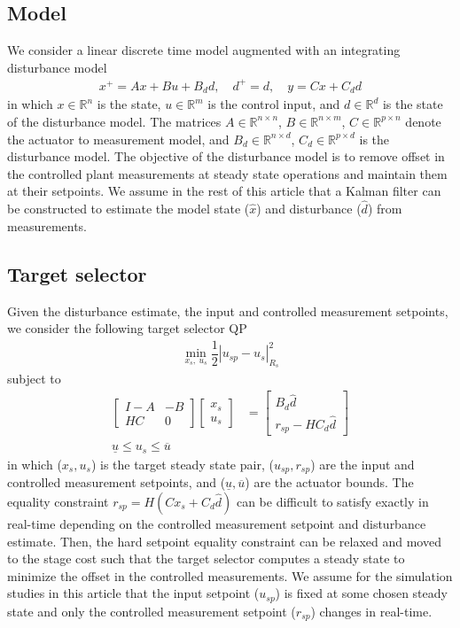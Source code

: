 \documentclass[preprint,5p, twocolumn, authoryear]{elsarticle}
\newcommand{\bbR}{\mathbb{R}}
\begin{document}
\subsection{Model}
We consider a linear discrete time model augmented with an 
integrating disturbance model \citep{pannocchia:rawlings:2003}
\begin{align}\label{eq:ltimodel}
    x^+ = Ax + Bu + B_dd, \quad d^+ = d, \quad y = Cx + C_dd
\end{align}
in which $x \in \bbR^n$ is the state, 
$u \in \bbR^m$ is the control input, and
$d \in \bbR^d$ is the state of the disturbance
model. The matrices $A \in \bbR^{n \times n}$, 
$B \in \bbR^{n \times m}$,  
$C \in \bbR^{p \times n}$ denote the actuator to measurement 
model, and $B_d \in \bbR^{n \times d}$, $C_d \in \bbR^{p \times d}$
is the disturbance model.
The objective of the disturbance model
is to remove offset in the controlled 
plant measurements at steady
state operations and maintain
them at their setpoints.
We assume in the rest of this 
article that a Kalman filter can be constructed to 
estimate the model state ($\hat{x}$) and disturbance ($\hat{d}$) 
from measurements. 

\subsection{Target selector}
Given the disturbance estimate, the
input and controlled measurement setpoints,
we consider the following target selector QP
\begin{align}
    \min_{x_s, \ u_s}  \dfrac{1}{2} |u_{sp} - u_s|^2_{R_s}
\end{align}
subject to
\begin{align}  
    \begin{bmatrix}
        I -A & -B \\
        HC & 0
    \end{bmatrix} \begin{bmatrix}
        x_s \\
        u_s
    \end{bmatrix} &= \begin{bmatrix}
        B_d\hat{d} \\
        r_{sp} - HC_d\hat{d}
    \end{bmatrix} \\
    \underline{u} \leq u_s \leq \overline{u}
\end{align}
in which ($x_s, u_s$) is the 
target steady state pair, ($u_{sp}, r_{sp}$) 
are the input and controlled measurement setpoints,
and ($\underline{u}, \overline{u}$) are the 
actuator bounds.
The equality constraint $r_{sp} = H(Cx_s + C_d\hat{d})$
can be difficult to satisfy exactly in real-time 
depending on the controlled measurement setpoint 
and disturbance estimate. 
Then, the hard setpoint equality constraint 
can be relaxed and moved to the stage cost such 
that the target selector computes a steady state
to minimize the offset in the controlled measurements. 
We assume for the simulation studies
in this article that the input setpoint ($u_{sp}$)
is fixed at some chosen steady state and 
only the controlled measurement setpoint ($r_{sp}$) 
changes in real-time.
\end{document}
